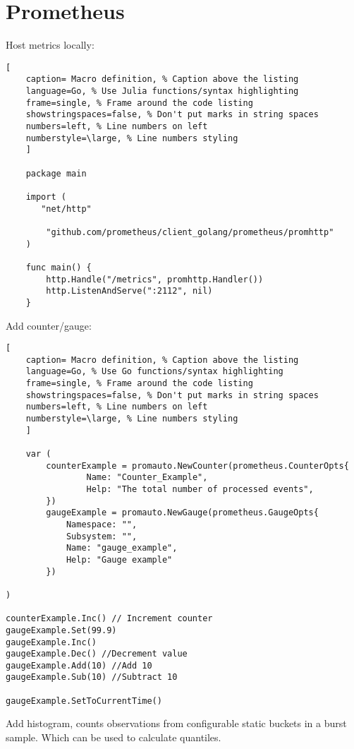 \documentclass[11pt]{scrartcl} %
\begin{document}
\section{Prometheus}

Host metrics locally:

\begin{lstlisting}[
	caption= Macro definition, % Caption above the listing
	language=Go, % Use Julia functions/syntax highlighting
	frame=single, % Frame around the code listing
	showstringspaces=false, % Don't put marks in string spaces
	numbers=left, % Line numbers on left
	numberstyle=\large, % Line numbers styling
	]

	package main

	import (
       "net/http"

        "github.com/prometheus/client_golang/prometheus/promhttp"
	)

	func main() {
        http.Handle("/metrics", promhttp.Handler())
        http.ListenAndServe(":2112", nil)
	}

\end{lstlisting}


Add counter/gauge:

\begin{lstlisting}[
	caption= Macro definition, % Caption above the listing
	language=Go, % Use Go functions/syntax highlighting
	frame=single, % Frame around the code listing
	showstringspaces=false, % Don't put marks in string spaces
	numbers=left, % Line numbers on left
	numberstyle=\large, % Line numbers styling
	]

	var (
        counterExample = promauto.NewCounter(prometheus.CounterOpts{
                Name: "Counter_Example",
                Help: "The total number of processed events",
        })
		gaugeExample = promauto.NewGauge(prometheus.GaugeOpts{
			Namespace: "",
			Subsystem: "",
			Name: "gauge_example",
			Help: "Gauge example"
		})

)

counterExample.Inc() // Increment counter
gaugeExample.Set(99.9)
gaugeExample.Inc()
gaugeExample.Dec() //Decrement value
gaugeExample.Add(10) //Add 10
gaugeExample.Sub(10) //Subtract 10

gaugeExample.SetToCurrentTime()

\end{lstlisting}

Add histogram, counts observations from configurable static buckets in a burst sample. Which can be used to calculate
quantiles. 
\end{document}
